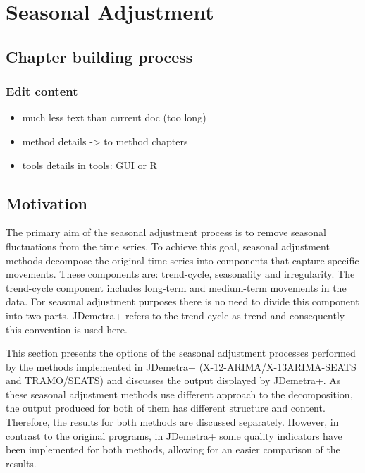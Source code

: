 \documentclass[
  letterpaper,
  DIV=11,
  numbers=noendperiod]{scrreprt}
\providecommand{\tightlist}{%
  \setlength{\itemsep}{0pt}\setlength{\parskip}{0pt}}\usepackage{longtable,booktabs,array}
\begin{document}
\hypertarget{seasonal-adjustment-1}{%
\chapter{Seasonal Adjustment}\label{seasonal-adjustment-1}}

\hypertarget{chapter-building-process}{%
\section{Chapter building process}\label{chapter-building-process}}

\hypertarget{edit-content}{%
\subsection{Edit content}\label{edit-content}}

\begin{itemize}
\tightlist
\item
  much less text than current doc (too long)
\item
  method details -\textgreater{} to method chapters
\item
  tools details in tools: GUI or R
\end{itemize}

\hypertarget{motivation}{%
\section{Motivation}\label{motivation}}

The primary aim of the seasonal adjustment process is to remove seasonal
fluctuations from the time series. To achieve this goal, seasonal
adjustment methods decompose the original time series into components
that capture specific movements. These components are: trend-cycle,
seasonality and irregularity. The trend-cycle component includes
long-term and medium-term movements in the data. For seasonal adjustment
purposes there is no need to divide this component into two parts.
JDemetra+ refers to the trend-cycle as trend and consequently this
convention is used here.

This section presents the options of the seasonal adjustment processes
performed by the methods implemented in JDemetra+
(X-12-ARIMA/X-13ARIMA-SEATS and TRAMO/SEATS) and discusses the output
displayed by JDemetra+. As these seasonal adjustment methods use
different approach to the decomposition, the output produced for both of
them has different structure and content. Therefore, the results for
both methods are discussed separately. However, in contrast to the
original programs, in JDemetra+ some quality indicators have been
implemented for both methods, allowing for an easier comparison of the
results.
\end{document}
